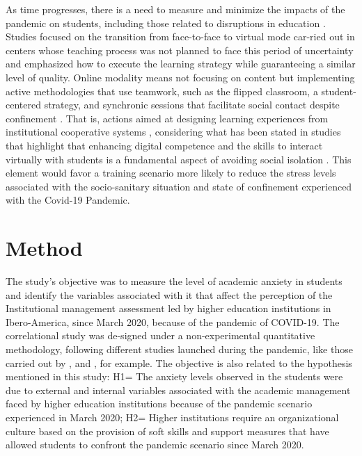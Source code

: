 \documentclass[english]{textolivre}
\begin{document}
As time progresses, there is a need to measure and minimize the impacts of the pandemic on students, including those related to disruptions in education \cite[p.~1]{almeida_editorial_2021}. Studies focused on the transition from face-to-face to virtual mode car-ried out in centers whose teaching process was not planned to face this period of uncertainty and emphasized how to execute the learning strategy while guaranteeing a similar level of quality. Online modality means not focusing on content but implementing active methodologies that use teamwork, such as the flipped classroom, a student-centered strategy, and synchronic sessions that facilitate social contact despite confinement \cite{de_vincenzi_aula_2020}. That is, actions aimed at designing learning experiences from institutional cooperative systems \cite{connor_chick_using_2020}, considering what has been stated in studies that highlight that enhancing digital competence and the skills to interact virtually with students is a fundamental aspect of avoiding social isolation \cite{fernandez_cruz_evaluation_2020}. This element would favor a training scenario more likely to reduce the stress levels associated with the socio-sanitary situation and state of confinement experienced with the Covid-19 Pandemic.

\section{Method}

The study's objective was to measure the level of academic anxiety in students and identify the variables associated with it that affect the perception of the Institutional management assessment led by higher education institutions in Ibero-America, since March 2020, because of the pandemic of COVID-19. The correlational study was de-signed under a non-experimental quantitative methodology, following different studies launched during the pandemic, like those carried out by \textcite{perez_escoda_digital_2021}, and \textcite{coronado_environmental_2021}, for example. The objective is also related to the hypothesis mentioned in this study: H1= The anxiety levels observed in the students were due to external and internal variables associated with the academic management faced by higher education institutions because of the pandemic scenario experienced in March 2020; H2= Higher institutions require an organizational culture based on the provision of soft skills and support measures that have allowed students to confront the pandemic scenario since March 2020.
\end{document}
